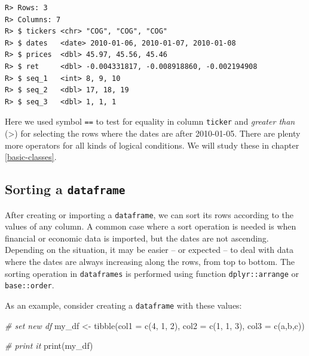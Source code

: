 \documentclass[
  12pt,
]{book}
\newenvironment{Shaded}{\begin{snugshade}}{\end{snugshade}}
\newcommand{\AttributeTok}[1]{\textcolor[rgb]{0.61,0.61,0.61}{#1}}
\newcommand{\CommentTok}[1]{\textcolor[rgb]{0.37,0.37,0.37}{\textit{#1}}}
\newcommand{\DecValTok}[1]{\textcolor[rgb]{0.06,0.06,0.06}{#1}}
\newcommand{\FunctionTok}[1]{\textcolor[rgb]{0,0,0}{#1}}
\newcommand{\NormalTok}[1]{#1}
\newcommand{\OtherTok}[1]{\textcolor[rgb]{0.37,0.37,0.37}{#1}}
\newcommand{\StringTok}[1]{\textcolor[rgb]{0.5,0.5,0.5}{#1}}
\begin{document}
\begin{verbatim}
R> Rows: 3
R> Columns: 7
R> $ tickers <chr> "COG", "COG", "COG"
R> $ dates   <date> 2010-01-06, 2010-01-07, 2010-01-08
R> $ prices  <dbl> 45.97, 45.56, 45.46
R> $ ret     <dbl> -0.004331817, -0.008918860, -0.002194908
R> $ seq_1   <int> 8, 9, 10
R> $ seq_2   <dbl> 17, 18, 19
R> $ seq_3   <dbl> 1, 1, 1
\end{verbatim}

Here we used symbol \texttt{==} to test for equality in column \texttt{ticker} and \emph{greater than} (\textgreater) for selecting the rows where the dates are after 2010-01-05. There are plenty more operators for all kinds of logical conditions. We will study these in chapter \ref{basic-classes}.

\hypertarget{sorting-a-dataframe}{%
\subsection{\texorpdfstring{Sorting a \texttt{dataframe}}{Sorting a dataframe}}\label{sorting-a-dataframe}}

After creating or importing a \texttt{dataframe}, we can sort its rows according to the values of any column. A common case where a sort operation is needed is when financial or economic data is imported, but the dates are not ascending. Depending on the situation, it may be easier -- or expected -- to deal with data where the dates are always increasing along the rows, from top to bottom. The sorting operation in \texttt{dataframes} is performed using function \texttt{dplyr::arrange} or \texttt{base::order}.  

As an example, consider creating a \texttt{dataframe} with these values:

\begin{Shaded}
\begin{Highlighting}[]
\CommentTok{\# set new df}
\NormalTok{my\_df }\OtherTok{\textless{}{-}} \FunctionTok{tibble}\NormalTok{(}\AttributeTok{col1 =} \FunctionTok{c}\NormalTok{(}\DecValTok{4}\NormalTok{, }\DecValTok{1}\NormalTok{, }\DecValTok{2}\NormalTok{), }
                \AttributeTok{col2 =} \FunctionTok{c}\NormalTok{(}\DecValTok{1}\NormalTok{, }\DecValTok{1}\NormalTok{, }\DecValTok{3}\NormalTok{), }
                \AttributeTok{col3 =} \FunctionTok{c}\NormalTok{(}\StringTok{\textquotesingle{}a\textquotesingle{}}\NormalTok{,}\StringTok{\textquotesingle{}b\textquotesingle{}}\NormalTok{,}\StringTok{\textquotesingle{}c\textquotesingle{}}\NormalTok{))}

\CommentTok{\# print it                  }
\FunctionTok{print}\NormalTok{(my\_df)}
\end{Highlighting}
\end{Shaded}
\end{document}
